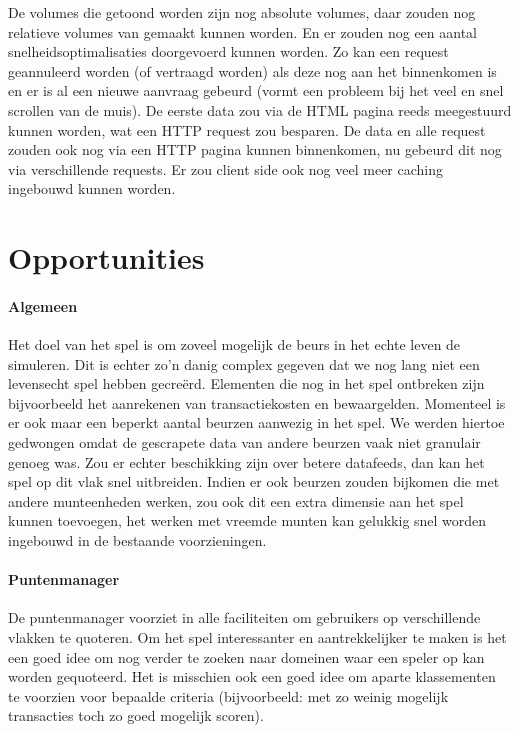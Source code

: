 De volumes die getoond worden zijn nog absolute volumes, daar zouden nog relatieve volumes van gemaakt kunnen worden. En er zouden nog een aantal snelheidsoptimalisaties doorgevoerd kunnen worden. Zo kan een request geannuleerd worden (of vertraagd worden) als deze nog aan het binnenkomen is en er is al een nieuwe aanvraag gebeurd (vormt een probleem bij het veel en snel scrollen van de muis). De eerste data zou via de HTML pagina reeds meegestuurd kunnen worden, wat een HTTP request zou besparen. De data en alle request zouden ook nog via een HTTP pagina kunnen binnenkomen, nu gebeurd dit nog via verschillende requests.
Er zou client side ook nog veel meer caching ingebouwd kunnen worden.


\section{Opportunities}

\paragraph{Algemeen} Het doel van het spel is om zoveel mogelijk de beurs in het echte leven de simuleren. Dit is echter zo'n danig complex gegeven dat we nog lang niet een levensecht spel hebben gecre\"erd. Elementen die nog in het spel ontbreken zijn bijvoorbeeld het aanrekenen van transactiekosten en bewaargelden. 
Momenteel is er ook maar een beperkt aantal beurzen aanwezig in het spel. We werden hiertoe gedwongen omdat de gescrapete data van andere beurzen vaak niet granulair genoeg was. Zou er echter beschikking zijn over betere datafeeds, dan kan het spel op dit vlak snel uitbreiden. Indien er ook beurzen zouden bijkomen die met andere munteenheden werken, zou ook dit een extra dimensie aan het spel kunnen toevoegen, het werken met vreemde munten kan gelukkig snel worden ingebouwd in de bestaande voorzieningen.

\paragraph{Puntenmanager} De puntenmanager voorziet in alle faciliteiten om gebruikers op verschillende vlakken te quoteren. Om het spel interessanter en aantrekkelijker te maken is het een goed idee om nog verder te zoeken naar domeinen waar een speler op kan worden gequoteerd. Het is misschien ook een goed idee om aparte klassementen te voorzien voor bepaalde criteria (bijvoorbeeld: met zo weinig mogelijk transacties toch zo goed mogelijk scoren).

